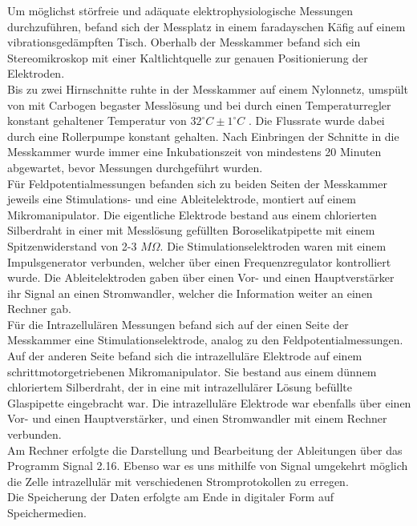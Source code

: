 \documentclass[a4paper,11pt]{report}
\begin{document}
{Um möglichst störfreie und adäquate elektrophysiologische Messungen durchzuführen, befand sich der Messplatz in einem faradayschen Käfig auf einem vibrationsgedämpften Tisch. Oberhalb der Messkammer befand sich ein Stereomikroskop mit einer Kaltlichtquelle zur genauen Positionierung der Elektroden.\\

Bis zu zwei Hirnschnitte ruhte in der Messkammer auf einem Nylonnetz, umspült von mit Carbogen begaster Messlösung und bei durch einen Temperaturregler konstant gehaltener Temperatur von $32^\circ C \pm 1^\circ C$ . Die Flussrate wurde dabei durch eine Rollerpumpe konstant gehalten. Nach Einbringen der Schnitte in die Messkammer wurde immer eine Inkubationszeit von mindestens 20 Minuten abgewartet, bevor Messungen durchgeführt wurden.\\

Für Feldpotentialmessungen befanden sich zu beiden Seiten der Messkammer jeweils eine Stimulations- und eine Ableitelektrode, montiert auf einem Mikromanipulator. Die eigentliche Elektrode bestand aus einem chlorierten Silberdraht in einer mit Messlösung gefüllten Boroselikatpipette mit einem Spitzenwiderstand von 2-3 $M\Omega$. Die Stimulationselektroden waren mit einem Impulsgenerator verbunden, welcher über einen Frequenzregulator kontrolliert wurde. Die Ableitelektroden gaben über einen Vor- und einen Hauptverstärker ihr Signal an einen Stromwandler, welcher die Information weiter an einen Rechner gab.\\

Für die Intrazellulären Messungen befand sich auf der einen Seite der Messkammer eine Stimulationselektrode, analog zu den Feldpotentialmessungen. Auf der anderen Seite befand sich die intrazelluläre Elektrode auf einem schrittmotorgetriebenen Mikromanipulator. Sie bestand aus einem dünnem chloriertem Silberdraht, der in eine mit intrazellulärer Lösung befüllte Glaspipette eingebracht war. Die intrazelluläre Elektrode war ebenfalls über einen Vor- und einen Hauptverstärker, und einen Stromwandler mit einem Rechner verbunden.\\

Am Rechner erfolgte die Darstellung und Bearbeitung der Ableitungen über das Programm Signal 2.16. Ebenso war es uns mithilfe von Signal umgekehrt möglich die Zelle intrazellulär mit verschiedenen Stromprotokollen zu erregen.\\

Die Speicherung der Daten erfolgte am Ende in digitaler Form auf Speichermedien.\\

}
\end{document}
